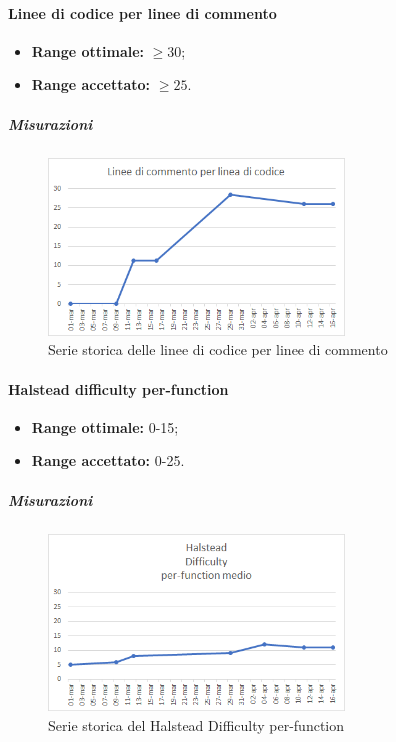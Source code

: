 			\paragraph{Linee di codice per linee di commento} \Spazio
			\begin{itemize}
				\item \textbf{Range ottimale:} $\geq30$;
				\item \textbf{Range accettato:} $\geq25$.
			\end{itemize}
		    \subparagraph{Misurazioni}
		    \begin{figure}[H]
		   	\centering 
		    	\includegraphics[width=0.7\textwidth]{Images/comm.png}
		    	\caption{Serie storica delle linee di codice per linee di commento}
		    	\label{comm} 
		    \end{figure}
			\paragraph{Halstead difficulty per-function} \Spazio
			\begin{itemize}
				\item \textbf{Range ottimale:} 0-15;
				\item \textbf{Range accettato:} 0-25.
			\end{itemize}
		\subparagraph{Misurazioni}
		\begin{figure}[H]
			\centering 
			\includegraphics[width=0.7\textwidth]{Images/H-difficulty.png}
			\caption{Serie storica del Halstead Difficulty per-function}
			\label{diff} 
		\end{figure}
